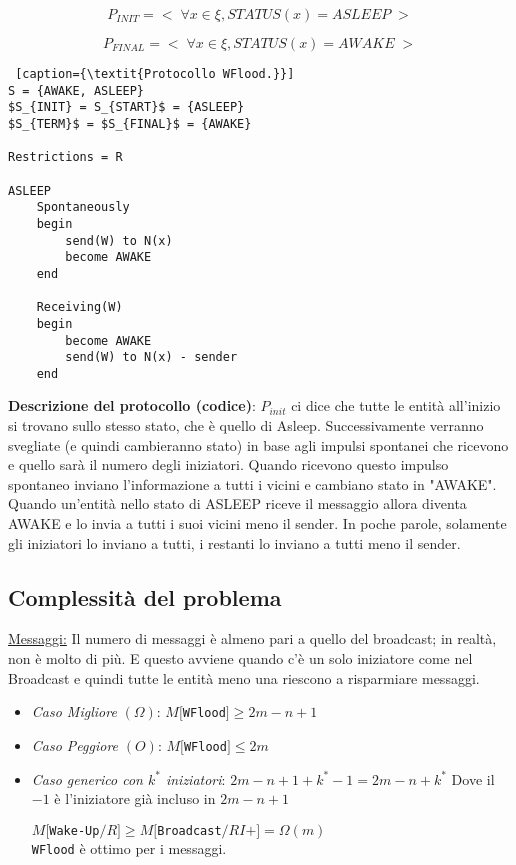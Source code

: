$$
    P_{INIT} =<\; \forall x \in \xi, STATUS(x) = ASLEEP \;>
$$

$$
    P_{FINAL} =<\; \forall x \in \xi, STATUS(x) = AWAKE \;>
$$

\begin{lstlisting} [caption={\textit{Protocollo WFlood.}}]
S = {AWAKE, ASLEEP}
$S_{INIT} = S_{START}$ = {ASLEEP}
$S_{TERM}$ = $S_{FINAL}$ = {AWAKE}

Restrictions = R

ASLEEP
    Spontaneously
    begin 
        send(W) to N(x)
        become AWAKE
    end

    Receiving(W)
    begin
        become AWAKE
        send(W) to N(x) - sender
    end
\end{lstlisting}

\textbf{Descrizione del protocollo (codice)}: $P_{init}$ ci dice che tutte le
entità all'inizio si trovano sullo stesso stato, che è quello di Asleep.
Successivamente verranno svegliate (e quindi cambieranno stato) in base agli
impulsi spontanei che ricevono e quello sarà il numero degli iniziatori. Quando
ricevono questo impulso spontaneo inviano l'informazione a tutti i vicini e
cambiano stato in "AWAKE". Quando un'entità nello stato di ASLEEP riceve il
messaggio allora diventa AWAKE e lo invia a tutti i suoi vicini meno il sender.
In poche parole, solamente gli iniziatori lo inviano a tutti, i restanti lo
inviano a tutti meno il sender.

\subsection{Complessità del problema}
\underline{Messaggi:}
Il numero di messaggi è almeno pari a quello del broadcast; in realtà, non è
molto di più. E questo avviene quando c'è un solo iniziatore come nel Broadcast
e quindi tutte le entità meno una riescono a risparmiare messaggi.

\begin{itemize}
    \item \textit{Caso Migliore} $(\Omega)$: $M[$\texttt{WFlood}$] \geq 2m - n +
              1$
    \item \textit{Caso Peggiore} $(O)$: $M[$\texttt{WFlood}$] \leq 2m$
    \item \textit{Caso generico con $k^*$ iniziatori}: $2m-n+1 + k^* -1 =
              2m-n+k^*$ Dove il $-1$ è l'iniziatore già incluso in $2m-n+1$

          $M[$\texttt{Wake-Up}$/R] \geq M[$\texttt{Broadcast}$/RI+] =
              \Omega(m)$\\
          \texttt{WFlood} è ottimo per i messaggi.
\end{itemize}

